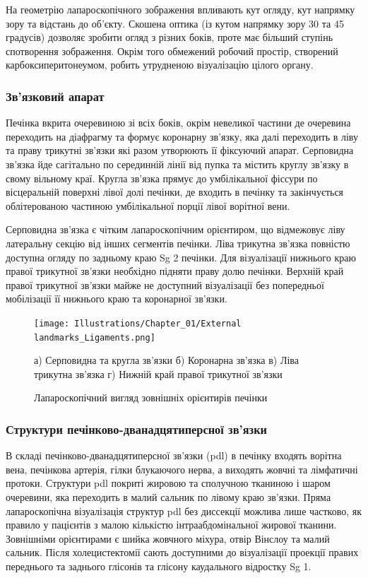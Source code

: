 \begin{refsection}
На геометрію лапароскопічного зображення впливають кут огляду, кут напрямку зору та відстань до об'єкту. Скошена оптика (із кутом напрямку зору 30 та 45 градусів) дозволяє зробити огляд з різних боків, проте має більший ступінь спотворення зображення. Окрім того обмежений робочий простір, створений карбоксиперитонеумом, робить утрудненою візуалізацію цілого органу.

\subsubsection{Зв'язковий апарат}

Печінка вкрита очеревиною зі всіх боків, окрім невеликої частини  де очеревина переходить на діафрагму та формує коронарну зв'язку, яка далі переходить в ліву та праву трикутні зв'язки які разом утворюють її фіксуючий апарат. Серповидна зв'язка йде сагітально по серединній лінії від пупка та містить круглу зв'язку в свому вільному краї. Кругла зв'язка прямує до умбілікальної фіссури по вісцеральній поверхні лівої долі печінки, де входить в печінку та закінчується облітерованою частиною умбілікальної порції лівої ворітної вени. 

Серповидна зв'язка є чітким лапароскопічним орієнтиром, що відмежовує ліву латеральну секцію від інших сегментів печінки. Ліва трикутна зв'язка повністю доступна огляду по задньому краю Sg 2 печінки. Для візуалізації нижнього краю правої трикутної зв'язки необхідно підняти праву долю печінки. Верхній край правої трикутної зв'язки майже не доступний візуалізації без попередньої мобілізації її нижнього краю та коронарної зв'язки. 

\begin{figure}[htbp]
\caption{Лапароскопічний вигляд зовнішніх орієнтирів печінки}

\texttt{[image: Illustrations/Chapter\_01/External landmarks\_Ligaments.png]}
\label{fig:External_landmarks_Ligaments}

\small
а) Серповидна та кругла зв'язки б) Коронарна зв'язка в) Ліва трикутна зв'язка г) Нижній край правої трикутної зв'язки
\end{figure}



\subsubsection{Структури печінково-дванадцятиперсної зв'язки}

В складі печінково-дванадцятиперсної зв'язки (\acrshort{pdl}) в печінку входять ворітна вена, печінкова артерія, гілки блукаючого нерва, а виходять жовчні та лімфатичні протоки. Структури \acrshort{pdl} покриті жировою та сполучною тканиною і шаром очеревини, яка переходить в малий сальник по лівому краю зв'язки. Пряма лапароскопічна візуалізація структур \acrshort{pdl} без диссекції можлива лише частково, як правило у пацієнтів з малою кількістю інтраабдомінальної жирової тканини. Зовнішніми орієнтирами є шийка жовчного міхура, отвір Вінслоу та малий сальник. Після холецистектомії сають доступними до візуалізації проекції правих переднього та заднього глісонів та глісону каудального відростку Sg 1. 


\end{refsection}
